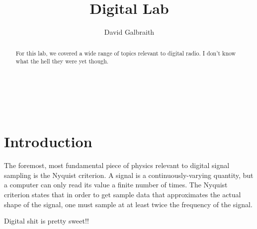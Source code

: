\documentclass[11pt]{article}
\begin{document}
\title{Digital Lab}
\author{David Galbraith}
\maketitle



\normalsize
\begin{abstract}  %

For this lab, we covered a wide range of topics relevant to digital
radio. I don't know what the hell they were yet though. %

\end{abstract}


\medskip                        %

\thispagestyle{plain}

\section{Introduction}
The foremost, most fundamental piece of physics relevant to digital
signal sampling is the Nyquist criterion. A signal is a
continuously-varying quantity, but a computer can only read its value a
finite number of times. The Nyquist criterion states that in order to
get sample data that approximates the actual shape of the signal, one
must sample at at least twice the frequency of the signal.  

Digital shit is pretty sweet!! %
\end{document}
